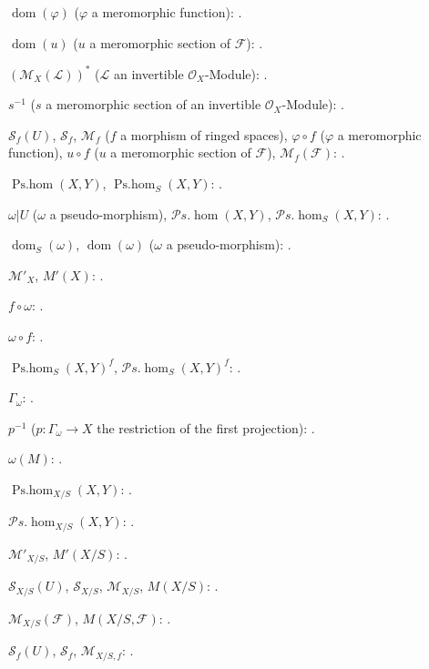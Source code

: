 $\operatorname{dom}(\varphi)$ ($\varphi$ a meromorphic function):
.

$\operatorname{dom}(u)$ ($u$ a meromorphic section of $\mathcal F$):
.

$(\mathcal M_X(\mathcal L))^{*}$
($\mathcal L$ an invertible $\mathcal O_X$-Module):
.

$s^{-1}$ ($s$ a meromorphic section of an invertible
$\mathcal O_X$-Module): .

$\mathcal S_f(U)$, $\mathcal S_f$, $\mathcal M_f$
($f$ a morphism of ringed spaces), $\varphi\circ f$ ($\varphi$ a
meromorphic function), $u\circ f$ ($u$ a meromorphic section of
$\mathcal F$), $\mathcal M_f(\mathcal F)$: .

$\operatorname{Ps.hom}(X,Y)$, $\operatorname{Ps.hom}_S(X,Y)$:
.

$\omega|U$ ($\omega$ a pseudo-morphism),
$\mathcal P\!s.\operatorname{hom}(X,Y)$,
$\mathcal P\!s.\operatorname{hom}_S(X,Y)$:
.

$\operatorname{dom}_S(\omega)$, $\operatorname{dom}(\omega)$
($\omega$ a pseudo-morphism): .

$\mathcal M'_X$, $M'(X)$: .

$f\circ\omega$: .

$\omega\circ f$: .

$\operatorname{Ps.hom}_S(X,Y)^f$,
$\mathcal P\!s.\operatorname{hom}_S(X,Y)^f$: .

$\Gamma_\omega$: .

$p^{-1}$ ($p:\Gamma_\omega\to X$ the restriction of the first
projection): .

$\omega(M)$: .

$\operatorname{Ps.hom}_{X/S}(X,Y)$: .

$\mathcal P\!s.\operatorname{hom}_{X/S}(X,Y)$: .

$\mathcal M'_{X/S}$, $M'(X/S)$: .

$\mathcal S_{X/S}(U)$, $\mathcal S_{X/S}$, $\mathcal M_{X/S}$,
$M(X/S)$: .

$\mathcal M_{X/S}(\mathcal F)$, $M(X/S,\mathcal F)$:
.

$\mathcal S_f(U)$, $\mathcal S_f$, $\mathcal M_{X/S,f}$:
.


